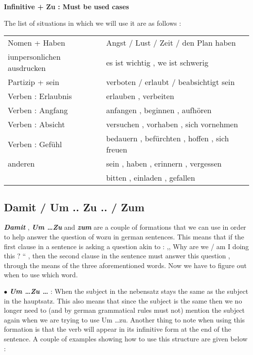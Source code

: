 \documentclass[a4paper,twocolumn,10pt]{article}
\newcommand{\newpar}
{\par \vspace{0.3cm}}
\newcommand{\subsectionend}
{
\nolinenumbers
\linenumbers
}
\newcommand{\bulletpoint}
{ $\bullet$  }
\newcommand{\tabularxtable}[3]
{

	\vspace{0.5cm}
	\nolinenumbers

	\begin{tabularx}{#1}{#2}
		#3
	\end{tabularx}

	\linenumbers
	\vspace{0.5cm}
}
\begin{document}


\textbf{Infinitive + Zu : Must be used cases}\newpar

The list of situations in which we will use it are as follows :\newpar

\tabularxtable
{0.95\linewidth}
{XX}
{

Nomen + Haben              & Angst / Lust / Zeit / den Plan haben\\
iunpersonlichen ausdrucken & es ist wichtig  , we ist schwerig \\
Partizip + sein            & verboten / erlaubt / beabsichtigt sein \\
Verben : Erlaubnis         & erlauben , verbeiten \\
Verben : Angfang           & anfangen  , beginnen , aufhören\\
Verben : Absicht           & versuchen , vorhaben , sich vornehmen\\
Verben : Gefühl            & bedauern , befürchten , hoffen , sich freuen\\
anderen                    & sein , haben , erinnern , vergessen \\
                           & bitten , einladen , gefallen \\
}


\subsectionend

\subsection{Damit / Um .. Zu .. / Zum}
\label{ssec:um_zu_}

\textbf{\textit{Damit}} , \textbf{\textit{Um \ldots Zu}} and
\textbf{\textit{zum}} are a couple of formations that we can use in order to
help answer the question of wozu in german sentences. This means that if the
first clause in a sentence is asking a question akin to : ,, Why are we / am I
doing this ? `` , then the second clause in the sentence must answer this
question , through the means of the three aforementioned words. Now we have to
figure out when to use which word.\newpar

\bulletpoint \textbf{\textit{Um \ldots Zu \ldots}} : When the subject in the
nebensatz stays the same as the subject in the hauptsatz. This also means that
since the subject is the same then we no longer need to (and by german
grammatical rules must not) mention the subject again when we are trying to use
Um \ldots zu. Another thing to note when using this formation is that the verb
will appear in its infinitive form at the end of the sentence. A couple of
examples showing how to use this structure are given below :\newpar
\end{document}
